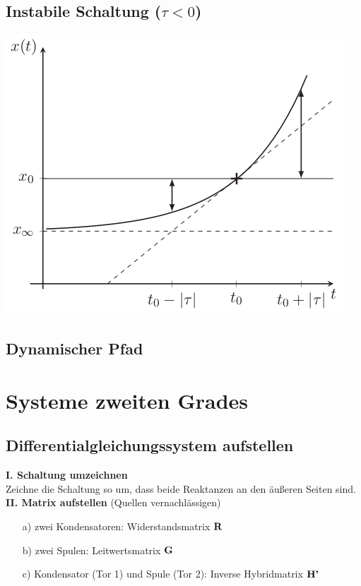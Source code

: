\documentclass[fs, footer]{latex4ei}
\begin{document}
\begin{multicols*}{4}
\subsection{Instabile Schaltung ($\tau < 0$)}
\includegraphics[width=.8\linewidth]{img/graph-instabil}
\subsection{Dynamischer Pfad}

	

\section{Systeme zweiten Grades}
	\subsection{Differentialgleichungssystem aufstellen}
		\textbf{I. Schaltung umzeichnen}\\
		Zeichne die Schaltung so um, dass beide Reaktanzen an den äußeren Seiten sind.\\
		\textbf{II. Matrix aufstellen}
		(Quellen vernachlässigen)
		\begin{itemize}
		\item[a)] zwei Kondensatoren: Widerstandsmatrix $\textbf{R}$
		\item[b)] zwei Spulen: Leitwertsmatrix $\textbf{G}$
		\item[c)] Kondensator (Tor 1) und Spule (Tor 2): Inverse Hybridmatrix $\textbf{H'}$
		\end{itemize}


\end{multicols*}
\end{document}
